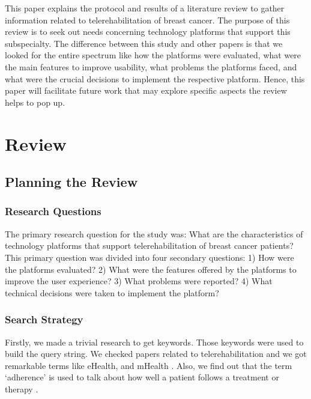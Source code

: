 \documentclass[conference]{IEEEtran}
\begin{document}
This paper explains the protocol and results of a literature review to gather information related to telerehabilitation of breast cancer. The purpose of this review is to seek out needs concerning technology platforms that support this subspecialty. The difference between this study and other papers is that we looked for the entire spectrum like how the platforms were evaluated, what were the main features to improve usability, what problems the platforms faced, and what were the crucial decisions to implement the respective platform. Hence, this paper will facilitate future work that may explore specific aspects the review helps to pop up.


\section{Review}

\subsection{Planning the Review}

\subsubsection{Research Questions} \label{subsubsection:research_question}
The primary research question for the study was: What are the characteristics of technology platforms that support telerehabilitation of breast cancer patients? This primary question was divided into four secondary questions: 1) How were the platforms evaluated? 2) What were the features offered by the platforms to improve the user experience? 3) What problems were reported? 4) What technical decisions were taken to implement the platform?

\subsubsection{Search Strategy}
Firstly, we made a trivial research to get keywords. Those keywords were used to build the query string. We checked papers related to telerehabilitation and we got remarkable terms like eHealth, and mHealth \cite{iacono_scoping_2016}. Also, we find out that the term `adherence' is used to talk about how well a patient follows a treatment or therapy \cite{JEMINIWA201959}.
\end{document}
